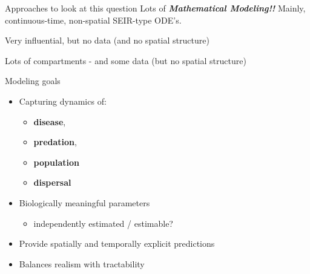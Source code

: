 \documentclass[
  11pt,
  ignorenonframetext,
  aspectratio=43]{beamer}
\providecommand{\tightlist}{%
  \setlength{\itemsep}{0pt}\setlength{\parskip}{0pt}}
\begin{document}
\begin{frame}{Approaches to look at this question}
\protect\hypertarget{approaches-to-look-at-this-question}{}
Lots of \textbf{\emph{Mathematical Modeling!!}} Mainly, continuous-time,
non-spatial SEIR-type ODE's.

\bcol
\col
{}

Very influential, but no data (and no spatial structure)

\col
\bc
{}
\ec

Lots of compartments - and some data (but no spatial structure)

\ecol
\end{frame}

\begin{frame}{Modeling goals}
\protect\hypertarget{modeling-goals}{}
\begin{itemize}
\item
  Capturing dynamics of:

  \begin{itemize}
  \tightlist
  \item
    \textbf{disease},
  \item
    \textbf{predation},
  \item
    \textbf{population}
  \item
    \textbf{dispersal}
  \end{itemize}
\item
  Biologically meaningful parameters

  \begin{itemize}
  \tightlist
  \item
    independently estimated / estimable?
  \end{itemize}
\item
  Provide spatially and temporally explicit predictions
\item
  Balances realism with tractability
\end{itemize}
\end{frame}
\end{document}
